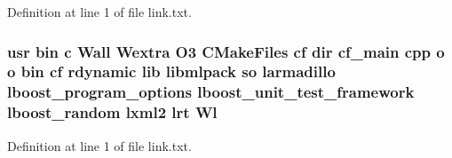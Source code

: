 Definition at line 1 of file link.\-txt.

\subsubsection[{Wl}]{\setlength{\rightskip}{0pt plus 5cm}usr bin c Wall Wextra O3 C\-Make\-Files cf dir cf\-\_\-main cpp o o bin cf rdynamic lib libmlpack so larmadillo lboost\-\_\-program\-\_\-options lboost\-\_\-unit\-\_\-test\-\_\-framework lboost\-\_\-random lxml2 lrt Wl}\label{methods_2cf_2CMakeFiles_2cf_8dir_2link_8txt_aa408f074a0895820cc122ee55034c58b}


Definition at line 1 of file link.\-txt.

